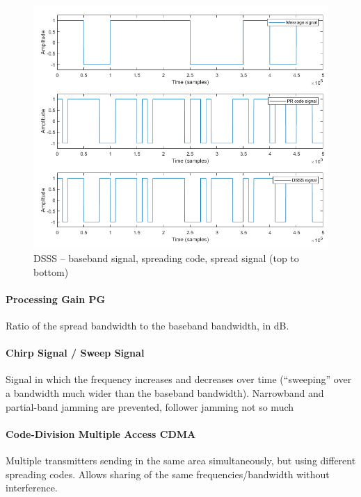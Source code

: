 \begin{figure}
	\centering
	\includegraphics[scale=0.6]{images/2-dsss.png}
	\caption{DSSS -- baseband signal, spreading code, spread signal (top to bottom)}
	\label{fig:dsss}
\end{figure}

\paragraph{Processing Gain PG}
Ratio of the spread bandwidth to the baseband bandwidth, in dB.


\paragraph{Chirp Signal / Sweep Signal}
Signal in which the frequency increases and decreases over time (``sweeping'' over a bandwidth much wider than the baseband bandwidth).
Narrowband and partial-band jamming are prevented, follower jamming not so much

\paragraph{Code-Division Multiple Access CDMA}
Multiple transmitters sending in the same area simultaneously, but using different spreading codes.
Allows sharing of the same frequencies/bandwidth without interference.
